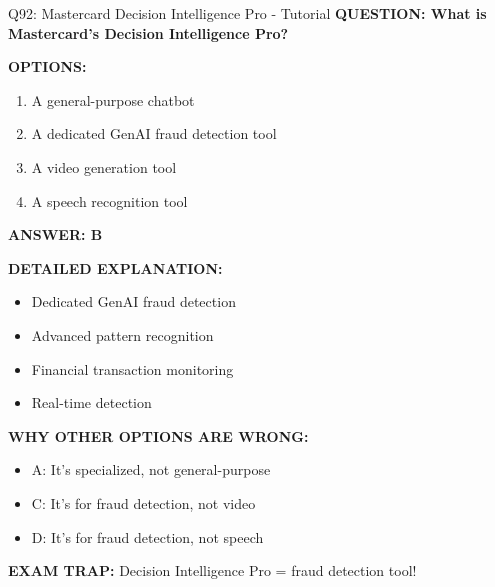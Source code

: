 \documentclass[8pt]{beamer}
\begin{document}
	\begin{frame}{Q92: Mastercard Decision Intelligence Pro - Tutorial}
		\fontsize{6.5}{7.5}\selectfont
		\textbf{QUESTION: What is Mastercard's Decision Intelligence Pro?}
		
		\vspace{0.1cm}
		\textbf{OPTIONS:}
		\begin{enumerate}
			\item A general-purpose chatbot
			\item A dedicated GenAI fraud detection tool
			\item A video generation tool
			\item A speech recognition tool
		\end{enumerate}
		
		\vspace{0.1cm}
		\textcolor{myblue}{\textbf{ANSWER: B}}
		
		\vspace{0.1cm}
		\textbf{DETAILED EXPLANATION:}
		\begin{itemize}
			\item Dedicated GenAI fraud detection
			\item Advanced pattern recognition
			\item Financial transaction monitoring
			\item Real-time detection
		\end{itemize}
		
		\vspace{0.1cm}
		\textcolor{myred}{\textbf{WHY OTHER OPTIONS ARE WRONG:}}
		\begin{itemize}
			\item \textcolor{myred}{A:} It's specialized, not general-purpose
			\item \textcolor{myred}{C:} It's for fraud detection, not video
			\item \textcolor{myred}{D:} It's for fraud detection, not speech
		\end{itemize}
		
		\textcolor{myred}{\textbf{EXAM TRAP:}} Decision Intelligence Pro = \textcolor{myblue}{fraud detection tool}!
	\end{frame}
	
\end{document}

